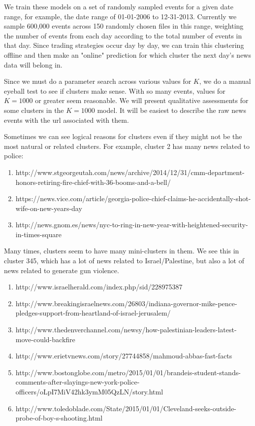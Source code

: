 \documentclass{article}
\begin{document}
	We train these models on a set of randomly sampled events for a given date range, for example, the date range of 01-01-2006 to 12-31-2013. Currently we sample 600,000 events across 150 randomly chosen files in this range, weighting the number of events from each day according to the total number of events in that day. Since trading strategies occur day by day, we can train this clustering offline and then make an "online" prediction for which cluster the next day's news data will belong in.

	Since we must do a parameter search across various values for $K$, we do a manual eyeball test to see if clusters make sense. With so many events, values for $K=1000$ or greater seem reasonable. We will present qualitative assessments for some clusters in the $K=1000$ model. It will be easiest to describe the raw news events with the url associated with them.

	Sometimes we can see logical reasons for clusters even if they might not be the most natural or related clusters. For example, cluster 2 has many news related to police:
	\begin{enumerate}
	\item http://www.stgeorgeutah.com/news/archive/2014/12/31/cmm-department-honors-retiring-fire-chief-with-36-booms-and-a-bell/
	\item https://news.vice.com/article/georgia-police-chief-claims-he-accidentally-shot-wife-on-new-years-day
	\item
	http://news.gnom.es/news/nyc-to-ring-in-new-year-with-heightened-security-in-times-square
	\end{enumerate}

	Many times, clusters seem to have many mini-clusters in them. We see this in cluster 345, which has a lot of news related to Israel/Palestine, but also a lot of news related to generate gun violence.
	\begin{enumerate}
	\item http://www.israelherald.com/index.php/sid/228975387
	\item http://www.breakingisraelnews.com/26803/indiana-governor-mike-pence-pledges-support-from-heartland-of-israel-jerusalem/
	\item http://www.thedenverchannel.com/newsy/how-palestinian-leaders-latest-move-could-backfire
	\item http://www.erietvnews.com/story/27744858/mahmoud-abbas-fast-facts
	\item http://www.bostonglobe.com/metro/2015/01/01/brandeis-student-stands-comments-after-slayings-new-york-police-officers/oLpI7MiV42hk3ymM05QzLN/story.html
	\item http://www.toledoblade.com/State/2015/01/01/Cleveland-seeks-outside-probe-of-boy-s-shooting.html
	\end{enumerate}
\end{document}
